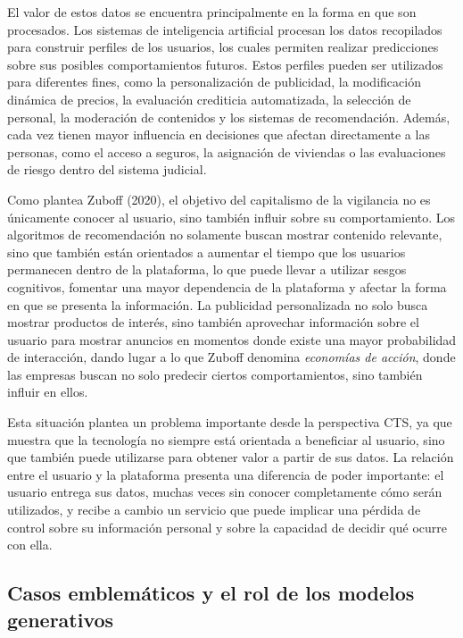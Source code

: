 \documentclass[11pt,a4paper]{article}
\begin{document}
El valor de estos datos se encuentra principalmente en la forma en que son procesados. Los sistemas de inteligencia artificial procesan los datos recopilados para construir perfiles de los usuarios, los cuales permiten realizar predicciones sobre sus posibles comportamientos futuros. Estos perfiles pueden ser utilizados para diferentes fines, como la personalización de publicidad, la modificación dinámica de precios, la evaluación crediticia automatizada, la selección de personal, la moderación de contenidos y los sistemas de recomendación. Además, cada vez tienen mayor influencia en decisiones que afectan directamente a las personas, como el acceso a seguros, la asignación de viviendas o las evaluaciones de riesgo dentro del sistema judicial.

Como plantea Zuboff (2020), el objetivo del capitalismo de la vigilancia no es únicamente conocer al usuario, sino también influir sobre su comportamiento. Los algoritmos de recomendación no solamente buscan mostrar contenido relevante, sino que también están orientados a aumentar el tiempo que los usuarios permanecen dentro de la plataforma, lo que puede llevar a utilizar sesgos cognitivos, fomentar una mayor dependencia de la plataforma y afectar la forma en que se presenta la información. La publicidad personalizada no solo busca mostrar productos de interés, sino también aprovechar información sobre el usuario para mostrar anuncios en momentos donde existe una mayor probabilidad de interacción, dando lugar a lo que Zuboff denomina \textit{economías de acción}, donde las empresas buscan no solo predecir ciertos comportamientos, sino también influir en ellos.

Esta situación plantea un problema importante desde la perspectiva CTS, ya que muestra que la tecnología no siempre está orientada a beneficiar al usuario, sino que también puede utilizarse para obtener valor a partir de sus datos. La relación entre el usuario y la plataforma presenta una diferencia de poder importante: el usuario entrega sus datos, muchas veces sin conocer completamente cómo serán utilizados, y recibe a cambio un servicio que puede implicar una pérdida de control sobre su información personal y sobre la capacidad de decidir qué ocurre con ella.

\subsection{Casos emblemáticos y el rol de los modelos generativos}
\end{document}
